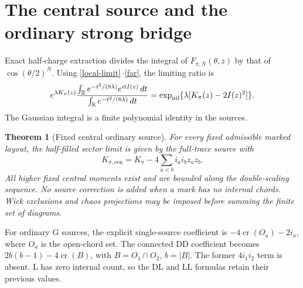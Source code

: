 \documentclass[11pt]{article}
\newtheorem{theorem}{Theorem}
\begin{document}
\newpage
\section{The central source and the ordinary strong bridge}
Exact half-charge extraction divides the integral of
$F_{\pi,N}(\theta,z)$ by that of $\cos(\theta/2)^N$.
Using \eqref{local-limit}--\eqref{far}, the limiting ratio is
\begin{equation}
 e^{\lambda K_\pi(z)}
 \frac{\int_{\mathbb R}e^{-t^2/(8\lambda)}e^{itI(z)}\,dt}
      {\int_{\mathbb R}e^{-t^2/(8\lambda)}\,dt}
 =\exp_{\rm nil}\{\lambda[K_\pi(z)-2I(z)^2]\}.
 \label{conditioned}
\end{equation}
The Gaussian integral is a finite polynomial identity in the sources.

\begin{theorem}[Fixed central ordinary source]
For every fixed admissible marked layout, the half-filled sector limit
is given by the full-trace source with
\[
 K_{\pi,\mathrm{cen}}=K_\pi-4\sum_{a<b}i_ai_bz_az_b.
\]
All higher fixed central moments exist and are bounded along the
double-scaling sequence. No source correction is added when a mark
has no internal chords. Wick exclusions and chaos projections may
be imposed before summing the finite set of diagrams.
\end{theorem}

For ordinary G sources, the explicit single-source coefficient is
$-4\operatorname{cr}(O_a)-2i_a$, where $O_a$ is the open-chord set.
The connected DD coefficient becomes
$2b(b-1)-4\operatorname{cr}(B)$, with $B=O_1\cap O_2$, $b=|B|$.
The former $4i_1i_2$ term is absent. L has zero internal count, so
the DL and LL formulas retain their previous values.
\end{document}
